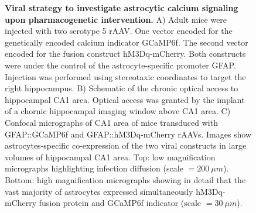 \begin{figure}[h!]
    \caption[Viral strategy to investigate astrocytic calcium signaling upon pharmacogenetic intervention.]{\textbf{Viral strategy to investigate astrocytic calcium signaling upon pharmacogenetic intervention.} 
    A) Adult mice were injected with two serotype 5 rAAV.
    One vector encoded for the genetically encoded calcium indicator GCaMP6f.
    The second vector encoded for the fusion construct hM3Dq-mCherry.
    Both constructs were under the control of the astrocyte-specific promoter GFAP.
    Injection was performed using stereotaxic coordinates to target the right hippocampus.
    B) Schematic of the chronic optical access to hippocampal CA1 area. 
    Optical access was granted by the implant of a chornic hippocampal imaging window above CA1 area. 
    C) Confocal micrographs of CA1 area of mice transduced with GFAP::GCaMP6f and GFAP::hM3Dq-mCherry rAAVs. 
    Images show astrocytes-specific co-expression of the two viral constructs in large volumes of hippocampal CA1 area. 
    Top: low magnification micrographs highlighting infection diffusion (scale $= 200\ \mu m$). 
    Bottom: high magnification micrographs showing in detail that the vast majority of astrocytes expressed simultaneously hM3Dq-mCherry fusion protein and GCaMP6f indicator (scale $= 30\ \mu m$).}
    \label{fig:chap4:mcherry_gcamp_expression}
\end{figure}
